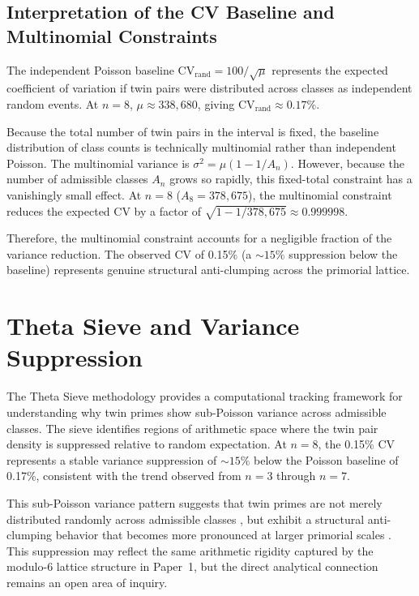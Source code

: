 \documentclass[11pt]{article}
\begin{document}
\subsection{Interpretation of the CV Baseline and Multinomial Constraints}

The independent Poisson baseline CV$_{\text{rand}} = 100/\sqrt{\mu}$ represents the expected coefficient of variation if twin pairs were distributed across classes as independent random events. At $n=8$, $\mu \approx 338{,}680$, giving CV$_{\text{rand}} \approx 0.17\%$. 

Because the total number of twin pairs in the interval is fixed, the baseline distribution of class counts is technically multinomial rather than independent Poisson. The multinomial variance is $\sigma^2 = \mu(1 - 1/A_n)$. However, because the number of admissible classes $A_n$ grows so rapidly, this fixed-total constraint has a vanishingly small effect. At $n=8$ ($A_8 = 378{,}675$), the multinomial constraint reduces the expected CV by a factor of $\sqrt{1 - 1/378{,}675} \approx 0.999998$. 

Therefore, the multinomial constraint accounts for a negligible fraction of the variance reduction. The observed CV of 0.15\% (a $\sim 15\%$ suppression below the baseline) represents genuine structural anti-clumping across the primorial lattice.

\section{Theta Sieve and Variance Suppression}
\label{sec:theta}

The Theta Sieve methodology provides a computational tracking framework for understanding why twin primes show sub-Poisson variance across admissible classes. The sieve identifies regions of arithmetic space where the twin pair density is suppressed relative to random expectation. At $n=8$, the 0.15\% CV represents a stable variance suppression of $\sim 15\%$ below the Poisson baseline of 0.17\%, consistent with the trend observed from $n=3$ through $n=7$.

This sub-Poisson variance pattern suggests that twin primes are not merely distributed randomly across admissible classes \cite{Bre14}, but exhibit a structural anti-clumping behavior that becomes more pronounced at larger primorial scales \cite{Mai85}. This suppression may reflect the same arithmetic rigidity captured by the modulo-6 lattice structure in Paper~1, but the direct analytical connection remains an open area of inquiry.
\end{document}

